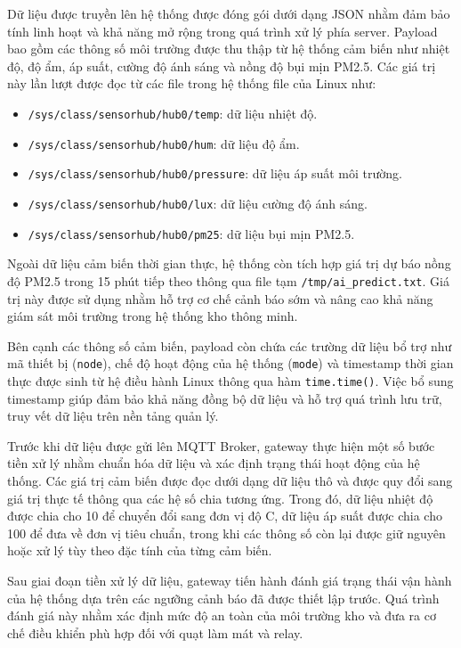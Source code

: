 Dữ liệu được truyền lên hệ thống được đóng gói dưới dạng JSON nhằm đảm bảo tính linh hoạt và khả năng mở rộng trong quá trình xử lý phía server. Payload bao gồm các thông số môi trường được thu thập từ hệ thống cảm biến như nhiệt độ, độ ẩm, áp suất, cường độ ánh sáng và nồng độ bụi mịn PM2.5. Các giá trị này lần lượt được đọc từ các file trong hệ thống file của Linux như:

\begin{itemize}
    \item \texttt{/sys/class/sensorhub/hub0/temp}: dữ liệu nhiệt độ.
    \item \texttt{/sys/class/sensorhub/hub0/hum}: dữ liệu độ ẩm.
    \item \texttt{/sys/class/sensorhub/hub0/pressure}: dữ liệu áp suất môi trường.
    \item \texttt{/sys/class/sensorhub/hub0/lux}: dữ liệu cường độ ánh sáng.
    \item \texttt{/sys/class/sensorhub/hub0/pm25}: dữ liệu bụi mịn PM2.5.
\end{itemize}

Ngoài dữ liệu cảm biến thời gian thực, hệ thống còn tích hợp giá trị dự báo nồng độ PM2.5 trong 15 phút tiếp theo thông qua file tạm \texttt{/tmp/ai\_predict.txt}. Giá trị này được sử dụng nhằm hỗ trợ cơ chế cảnh báo sớm và nâng cao khả năng giám sát môi trường trong hệ thống kho thông minh.

Bên cạnh các thông số cảm biến, payload còn chứa các trường dữ liệu bổ trợ như mã thiết bị (\texttt{node}), chế độ hoạt động của hệ thống (\texttt{mode}) và timestamp thời gian thực được sinh từ hệ điều hành Linux thông qua hàm \texttt{time.time()}. Việc bổ sung timestamp giúp đảm bảo khả năng đồng bộ dữ liệu và hỗ trợ quá trình lưu trữ, truy vết dữ liệu trên nền tảng quản lý.

Trước khi dữ liệu được gửi lên MQTT Broker, gateway thực hiện một số bước tiền xử lý nhằm chuẩn hóa dữ liệu và xác định trạng thái hoạt động của hệ thống. Các giá trị cảm biến được đọc dưới dạng dữ liệu thô và được quy đổi sang giá trị thực tế thông qua các hệ số chia tương ứng. Trong đó, dữ liệu nhiệt độ được chia cho 10 để chuyển đổi sang đơn vị độ C, dữ liệu áp suất được chia cho 100 để đưa về đơn vị tiêu chuẩn, trong khi các thông số còn lại được giữ nguyên hoặc xử lý tùy theo đặc tính của từng cảm biến.

Sau giai đoạn tiền xử lý dữ liệu, gateway tiến hành đánh giá trạng thái vận hành của hệ thống dựa trên các ngưỡng cảnh báo đã được thiết lập trước. Quá trình đánh giá này nhằm xác định mức độ an toàn của môi trường kho và đưa ra cơ chế điều khiển phù hợp đối với quạt làm mát và relay.

